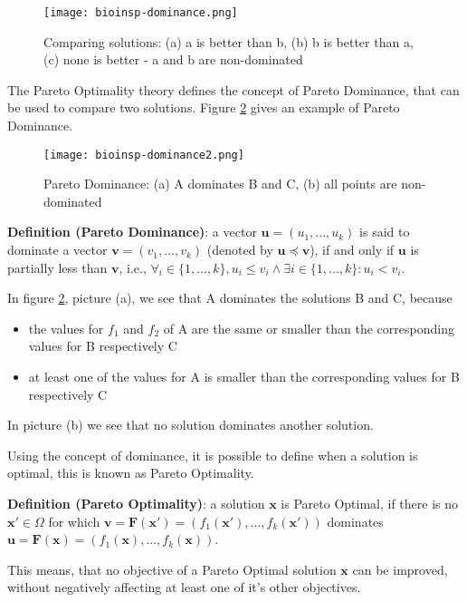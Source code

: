 \begin{figure}[ht!]
  \centering
  \texttt{[image: bioinsp-dominance.png]}
  \caption{Comparing solutions: (a) a is better than b, (b) b is better than a, (c) none is better - a and b are non-dominated}
  \label{fig:dominance}
\end{figure}

The Pareto Optimality theory defines the concept of Pareto Dominance, that can be used to compare two solutions. Figure \ref{fig:dominance2} gives an example of Pareto Dominance.

\begin{figure}[ht!]
  \centering
  \texttt{[image: bioinsp-dominance2.png]}
  \caption{Pareto Dominance: (a) A dominates B and C, (b) all points are non-dominated}
  \label{fig:dominance2}
\end{figure}

\noindent\textbf{Definition (Pareto Dominance)}: a vector $\mathbf{u} = (u_1,...,u_k)$ is said to dominate a vector $\mathbf{v} = (v_1,...,v_k)$ (denoted by $\mathbf{u} \preceq \mathbf{v}$), if and only if $\mathbf{u}$ is partially less than $\mathbf{v}$, i.e., $\forall_i \in \{1,...,k\}, u_i \leq v_i \land \exists i \in \{1,...,k\}: u_i < v_i$.

In figure \ref{fig:dominance2}, picture (a), we see that A dominates the solutions B and C, because
\begin{itemize}
  \item the values for $f_1$ and $f_2$ of A are the same or smaller than the corresponding values for B respectively C
  \item at least one of the values for A is smaller than the corresponding values for B respectively C
\end{itemize}
In picture (b) we see that no solution dominates another solution.

Using the concept of dominance, it is possible to define when a solution is optimal, this is known as Pareto Optimality.

\noindent\textbf{Definition (Pareto Optimality)}: a solution $\mathbf{x}$ is Pareto Optimal, if there is no $\mathbf{x'} \in \Omega$ for which $\mathbf{v} = \mathbf{F}(\mathbf{x'}) = (f_1(\mathbf{x'}),...,f_k(\mathbf{x'}))$ dominates $\mathbf{u} = \mathbf{F}(\mathbf{x}) = (f_1(\mathbf{x}),...,f_k(\mathbf{x}))$.

This means, that no objective of a Pareto Optimal solution $\mathbf{x}$ can be improved, without negatively affecting at least one of it's other objectives.

